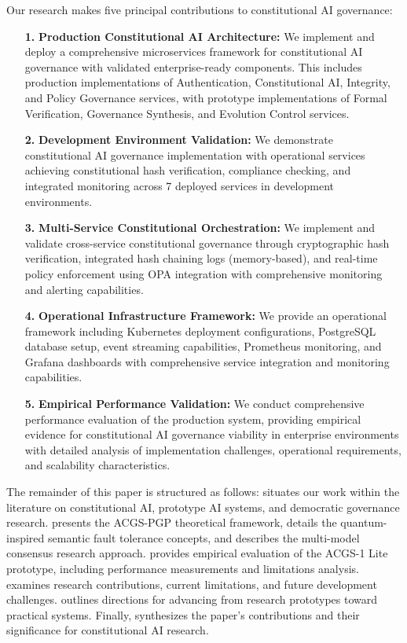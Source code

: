 \documentclass[manuscript,screen,9pt]{acmart}
\begin{document}
Our research makes five principal contributions to constitutional AI governance:
\begin{enumerate}[leftmargin=*,itemsep=2pt,parsep=1pt]
    \item[\textbf{1.}] \textbf{Production Constitutional AI Architecture:} We implement and deploy a comprehensive microservices framework for constitutional AI governance with validated enterprise-ready components. This includes production implementations of Authentication, Constitutional AI, Integrity, and Policy Governance services, with prototype implementations of Formal Verification, Governance Synthesis, and Evolution Control services.

    \item[\textbf{2.}] \textbf{Development Environment Validation:} We demonstrate constitutional AI governance implementation with operational services achieving constitutional hash verification, compliance checking, and integrated monitoring across 7 deployed services in development environments.

    \item[\textbf{3.}] \textbf{Multi-Service Constitutional Orchestration:} We implement and validate cross-service constitutional governance through cryptographic hash verification, integrated hash chaining logs (memory-based), and real-time policy enforcement using OPA integration with comprehensive monitoring and alerting capabilities.

    \item[\textbf{4.}] \textbf{Operational Infrastructure Framework:} We provide an operational framework including Kubernetes deployment configurations, PostgreSQL database setup, event streaming capabilities, Prometheus monitoring, and Grafana dashboards with comprehensive service integration and monitoring capabilities.

    \item[\textbf{5.}] \textbf{Empirical Performance Validation:} We conduct comprehensive performance evaluation of the production system, providing empirical evidence for constitutional AI governance viability in enterprise environments with detailed analysis of implementation challenges, operational requirements, and scalability characteristics.
\end{enumerate}

The remainder of this paper is structured as follows:  situates our work within the literature on constitutional AI, prototype AI systems, and democratic governance research.  presents the ACGS-PGP theoretical framework, details the quantum-inspired semantic fault tolerance concepts, and describes the multi-model consensus research approach.  provides empirical evaluation of the ACGS-1 Lite prototype, including performance measurements and limitations analysis.  examines research contributions, current limitations, and future development challenges.  outlines directions for advancing from research prototypes toward practical systems. Finally,  synthesizes the paper's contributions and their significance for constitutional AI research.
\end{document}

